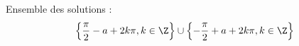 Ensemble des solutions :
\begin{displaymath}
  \left\lbrace \frac{\pi}{2} - a +2k\pi, k\in \Z\right\rbrace \cup  \left\lbrace -\frac{\pi}{2} + a +2k\pi, k\in \Z\right\rbrace
\end{displaymath}

